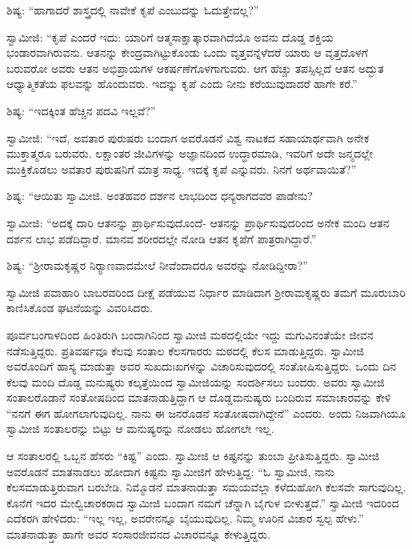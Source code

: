  ಶಿಷ್ಯ: “ಹಾಗಾದರೆ ಶಾಸ್ತ್ರದಲ್ಲಿ ನಾವೇಕೆ ಕೃಪೆ ಎಂಬುದನ್ನು ಓದುತ್ತೇವಲ್ಲ?” 

 ಸ್ವಾಮೀಜಿ: “ಕೃಪೆ ಎಂದರೆ ಇದು: ಯಾರಿಗೆ ಆತ್ಮಸಾಕ್ಷಾತ್ಕಾರವಾಗಿದೆಯೊ ಅವನು ದೊಡ್ಡ ಶಕ್ತಿಯ ಭಂಡಾರವಾಗಿರುವನು. ಆತನನ್ನು ಕೇಂದ್ರವಾಗಿಟ್ಟುಕೊಂಡು ಒಂದು ವೃತ್ತವನ್ನೆಳೆದರೆ ಯಾರು ಆ ವೃತ್ತದೊಳಗೆ ಬರುವರೋ ಅವರು ಆತನ ಅಭಿಪ್ರಾಯಗಳ ಆಕರ್ಷಣೆಗೊಳಗಾಗುವರು. ಆಗ ಹೆಚ್ಚು ತಪಸ್ಸಿಲ್ಲದೆ ಆತನ ಅದ್ಭುತ ಆಧ್ಯಾತ್ಮಿಕತೆಯ ಫಲವನ್ನು ಹೊಂದುವರು. ಇದನ್ನು ಕೃಪೆ ಎಂದು ನೀನು ಕರೆಯುವುದಾದರೆ ಹಾಗೇ ಕರೆ.” 

 ಶಿಷ್ಯ: “ಇದಕ್ಕಿಂತ ಹೆಚ್ಚಿನ ಪದವಿ ಇಲ್ಲವೆ?” 

 ಸ್ವಾಮೀಜಿ: “ಇದೆ, ಅವತಾರ ಪುರುಷರು ಬಂದಾಗ ಅವರೊಡನೆ ವಿಶ್ವ ನಾಟಕದ ಸಹಾಯಾರ್ಥವಾಗಿ ಅನೇಕ ಮುಕ್ತಾತ್ಮರೂ ಬರುವರು. ಲಕ್ಷಾಂತರ ಜೀವಿಗಳನ್ನು ಅಜ್ಞಾನದಿಂದ ಉದ್ಧಾರಮಾಡಿ, ಇವರಿಗೆ ಅದೇ ಜನ್ಮದಲ್ಲೇ ಮುಕ್ತಿಕೊಡಲು ಅವತಾರ ಪುರುಷನಿಗೆ ಮಾತ್ರ ಸಾಧ್ಯ. ಇದಕ್ಕೆ ಕೃಪೆ ಎನ್ನುವರು. ನಿನಗೆ ಅರ್ಥವಾಯಿತೆ?” 

 ಶಿಷ್ಯ: “ಆಯಿತು ಸ್ವಾಮೀಜಿ. ಅಂತಹವರ ದರ್ಶನ ಲಾಭದಿಂದ ಧನ್ಯರಾಗದವರ ಪಾಡೇನು? 

 ಸ್ವಾಮೀಜಿ: “ಅದಕ್ಕೆ ದಾರಿ ಆತನನ್ನು ಪ್ರಾರ್ಥಿಸುವುದೊಂದೆ- ಆತನನ್ನು ಪ್ರಾರ್ಥಿಸುವುದರಿಂದ ಅನೇಕ ಮಂದಿ ಆತನ ದರ್ಶನ ಲಾಭ ಪಡೆದಿದ್ದಾರೆ. ಮಾನವ ಶರೀರದಲ್ಲೇ ನೋಡಿ ಆತನ ಕೃಪೆಗೆ ಪಾತ್ರರಾಗಿದ್ದಾರೆ.” 

 ಶಿಷ್ಯ: “ಶ‍್ರೀರಾಮಕೃಷ್ಣರ ನಿರ‍್ಯಾಣವಾದಮೇಲೆ ನೀವೆಂದಾದರೂ ಅವರನ್ನು ನೋಡಿದ್ದೀರಾ?” 

 ಸ್ವಾಮೀಜಿ ಪವಾಹಾರಿ ಬಾಬರವರಿಂದ ದೀಕ್ಷೆ ಪಡೆಯುವ ನಿರ್ಧಾರ ಮಾಡಿದಾಗ ಶ‍್ರೀರಾಮಕೃಷ್ಣರು ತಮಗೆ ಮೂರುಬಾರಿ ಕಾಣಿಸಿಕೊಂಡ ಘಟನೆಯನ್ನು ವಿವರಿಸಿದರು. 

\delimiter

 ಪೂರ್ವಬಂಗಾಳದಿಂದ ಹಿಂತಿರುಗಿ ಬಂದಾಗಿನಿಂದ ಸ್ವಾಮೀಜಿ ಮಠದಲ್ಲಿಯೇ ಇದ್ದು ಮಗುವಿನಂತೆಯೇ ಜೀವನ ನಡೆಸುತ್ತಿದ್ದರು. ಪ್ರತಿವರ್ಷವೂ ಕೆಲವು ಸಂತಾಲ ಕೆಲಸಗಾರರು ಮಠದಲ್ಲಿ ಕೆಲಸ ಮಾಡುತ್ತಿದ್ದರು. ಸ್ವಾಮೀಜಿ ಅವರೊಂದಿಗೆ ಹಾಸ್ಯ ಮಾಡುತ್ತಾ ಅವರ ಸುಖದುಃಖಗಳನ್ನು ವಿಚಾರಿಸುವುದರಲ್ಲಿ ಸಂತೋಷಿಸುತ್ತಿದ್ದರು. ಒಂದು ದಿನ ಕೆಲವು ಮಂದಿ ದೊಡ್ಡ ಮನುಷ್ಯರು ಕಲ್ಕತ್ತೆಯಿಂದ ಸ್ವಾಮೀಜಿಯನ್ನು ಸಂದರ್ಶಿಸಲು ಬಂದರು. ಅವರು ಸ್ವಾಮೀಜಿ ಸಂತಾಲರೊಡಾನೆ ಸಂತೋಷದಿಂದ ಮಾತನಾಡುತ್ತಿದ್ದಾಗ ಆ ದೊಡ್ಡಮನುಷ್ಯರು ಬಂದಿರುವ ಸಮಾಚಾರವನ್ನು ಕೇಳಿ “ನನಗೆ ಈಗ ಹೋಗಲಾಗುವುದಿಲ್ಲ. ನಾನು ಈ ಜನರೊಡನೆ ಸಂತೋಷವಾಗಿದ್ದೇನೆ” ಎಂದರು. ಅಂದು ನಿಜವಾಗಿಯೂ ಸ್ವಾಮೀಜಿ ಸಂತಾಲರನ್ನು ಬಿಟ್ಟು ಆ ಮನುಷ್ಯರನ್ನು ನೋಡಲು ಹೋಗಲೇ ಇಲ್ಲ. 

 ಆ ಸಂತಾಲರಲ್ಲಿ ಒಬ್ಬನ ಹೆಸರು “ಕಿಷ್ಟ” ಎಂದು. ಸ್ವಾಮೀಜಿ ಆ ಕಿಷ್ಟನನ್ನು ತುಂಬಾ ಪ್ರೀತಿಸುತ್ತಿದ್ದರು. ಸ್ವಾಮೀಜಿ ಅವರೊಡನೆ ಮಾತನಾಡಲು ಹೋದಾಗ ಕಿಷ್ಟನು ಸ್ವಾಮೀಜಿಗೆ ಹೇಳುತ್ತಿದ್ದ: “ಓ ಸ್ವಾಮೀಜಿ, ನಾನು ಕೆಲಸಮಾಡುತ್ತಿರುವಾಗ ಬರಬೇಡಿ. ನಿಮ್ಮೊಡನೆ ಮಾತನಾಡುತ್ತಾ ಸಮಯವೆಲ್ಲಾ ಕಳೆದುಹೋಗಿ ಕೆಲಸವೇ ಸಾಗುವುದಿಲ್ಲ. ಕೊನೆಗೆ ಇದರ ಮೇಲ್ವಿಚಾರಕರಾದ ಸ್ವಾಮೀಜಿ ಬಂದಾಗ ನಮಗೆ ಚೆನ್ನಾಗಿ ಬೈಗುಳ ಬೀಳುತ್ತದೆ.” ಸ್ವಾಮೀಜಿ ಇದರಿಂದ ಎದೆಕರಗಿ ಹೇಳಿದರು: “ಇಲ್ಲ ಇಲ್ಲ, ಅವರೇನನ್ನೂ ಬೈಯುವುದಿಲ್ಲ. ನಿಮ್ಮ ಊರಿನ ವಿಚಾರ ಸ್ವಲ್ಪ ಹೇಳು.” ಮಾತನಾಡುತ್ತಾ ಹಾಗೇ ಅವರ ಸಂಸಾರಜೀವನದ ವಿಚಾರವನ್ನೂ ಕೇಳುತ್ತಿದ್ದರು. 

